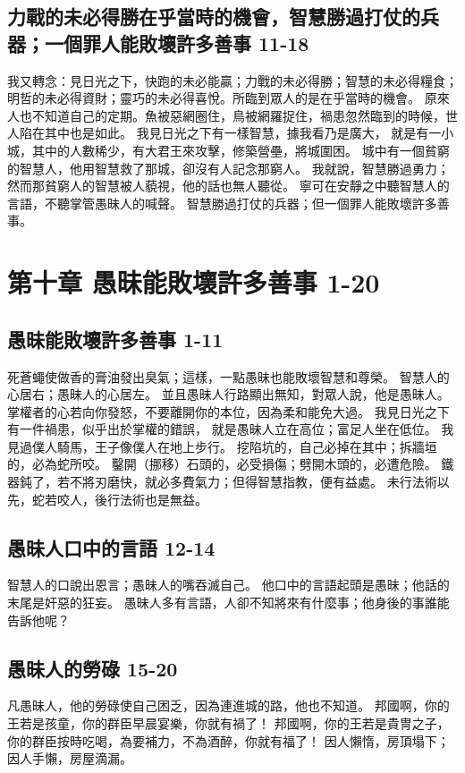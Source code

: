 \subsection{力戰的未必得勝在乎當時的機會，智慧勝過打仗的兵器；一個罪人能敗壞許多善事 11-18}
我又轉念：見日光之下，快跑的未必能贏；力戰的未必得勝；智慧的未必得糧食；明哲的未必得資財；靈巧的未必得喜悅。所臨到眾人的是在乎當時的機會。
原來人也不知道自己的定期。魚被惡網圈住，鳥被網羅捉住，禍患忽然臨到的時候，世人陷在其中也是如此。
我見日光之下有一樣智慧，據我看乃是廣大，
就是有一小城，其中的人數稀少，有大君王來攻擊，修築營壘，將城圍困。
城中有一個貧窮的智慧人，他用智慧救了那城，卻沒有人記念那窮人。
我就說，智慧勝過勇力；然而那貧窮人的智慧被人藐視，他的話也無人聽從。
寧可在安靜之中聽智慧人的言語，不聽掌管愚昧人的喊聲。
智慧勝過打仗的兵器；但一個罪人能敗壞許多善事。



\section{第十章 愚昧能敗壞許多善事 1-20}
\subsection{愚昧能敗壞許多善事 1-11}
死蒼蠅使做香的膏油發出臭氣；這樣，一點愚昧也能敗壞智慧和尊榮。
智慧人的心居右；愚昧人的心居左。
並且愚昧人行路顯出無知，對眾人說，他是愚昧人。
掌權者的心若向你發怒，不要離開你的本位，因為柔和能免大過。
我見日光之下有一件禍患，似乎出於掌權的錯誤，
就是愚昧人立在高位；富足人坐在低位。
我見過僕人騎馬，王子像僕人在地上步行。
挖陷坑的，自己必掉在其中；拆牆垣的，必為蛇所咬。
鑿開（挪移）石頭的，必受損傷；劈開木頭的，必遭危險。
鐵器鈍了，若不將刃磨快，就必多費氣力；但得智慧指教，便有益處。
未行法術以先，蛇若咬人，後行法術也是無益。

\subsection{愚昧人口中的言語 12-14}
智慧人的口說出恩言；愚昧人的嘴吞滅自己。
他口中的言語起頭是愚昧；他話的末尾是奸惡的狂妄。
愚昧人多有言語，人卻不知將來有什麼事；他身後的事誰能告訴他呢？
\subsection{愚昧人的勞碌 15-20}
凡愚昧人，他的勞碌使自己困乏，因為連進城的路，他也不知道。
邦國啊，你的王若是孩童，你的群臣早晨宴樂，你就有禍了！
邦國啊，你的王若是貴冑之子，你的群臣按時吃喝，為要補力，不為酒醉，你就有福了！
因人懶惰，房頂塌下；因人手懶，房屋滴漏。


